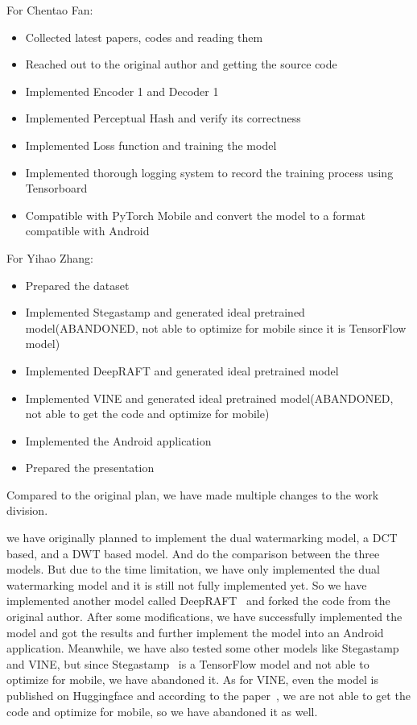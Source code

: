 \documentclass[acmsmall, nonacm]{acmart}
\begin{document}
For Chentao Fan:
\begin{itemize}
  \item Collected latest papers, codes and reading them
  \item Reached out to the original author and getting the source code
  \item Implemented Encoder 1 and Decoder 1
  \item Implemented Perceptual Hash and verify its correctness
  \item Implemented Loss function and training the model
  \item Implemented thorough logging system to record the training process using Tensorboard
  \item Compatible with PyTorch Mobile and convert the model to a format compatible with Android
\end{itemize}

For Yihao Zhang:
\begin{itemize}
  \item Prepared the dataset
  \item Implemented Stegastamp and generated ideal pretrained model(ABANDONED, not able to optimize for mobile since it is TensorFlow model)
  \item Implemented DeepRAFT and generated ideal pretrained model
  \item Implemented VINE and generated ideal pretrained model(ABANDONED, not able to get the code and optimize for mobile)
  \item Implemented the Android application
  \item Prepared the presentation
\end{itemize}

Compared to the original plan, we have made multiple changes to the work division.

we have originally planned to implement the dual watermarking model, a DCT based, and a DWT based model.
And do the comparison between the three models.
But due to the time limitation, we have only implemented the dual watermarking model and it is still not fully implemented yet.
So we have implemented another model called DeepRAFT~\cite{quOnlyYouDeep2022} and forked the code from the original author.
After some modifications, we have successfully implemented the model and got the results and further implement the model into an Android application.
Meanwhile, we have also tested some other models like Stegastamp and VINE, but since Stegastamp~\cite{tancikStegaStampInvisibleHyperlinks2020} is a TensorFlow model and not able to optimize for mobile, we have abandoned it.
As for VINE, even the model is published on Huggingface and according to the paper~\cite{luRobustWatermarkingUsing2025}, we are not able to get the code and optimize for mobile, so we have abandoned it as well.



\end{document}
